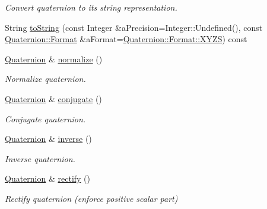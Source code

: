 \begin{DoxyCompactItemize}
\begin{DoxyCompactList}\small\item\em Convert quaternion to its string representation. \end{DoxyCompactList}\item 
String \hyperlink{classlibrary_1_1math_1_1geom_1_1trf_1_1rot_1_1_quaternion_a7e25375352f2e329a6053524d7deb226}{to\+String} (const Integer \&a\+Precision=Integer\+::\+Undefined(), const \hyperlink{classlibrary_1_1math_1_1geom_1_1trf_1_1rot_1_1_quaternion_a2ca851b117657819310fe5a9b9e5d681}{Quaternion\+::\+Format} \&a\+Format=\hyperlink{classlibrary_1_1math_1_1geom_1_1trf_1_1rot_1_1_quaternion_a2ca851b117657819310fe5a9b9e5d681a11c51ecd5dc6f86ba3c1ae79e21482f5}{Quaternion\+::\+Format\+::\+X\+Y\+ZS}) const
\item 
\hyperlink{classlibrary_1_1math_1_1geom_1_1trf_1_1rot_1_1_quaternion}{Quaternion} \& \hyperlink{classlibrary_1_1math_1_1geom_1_1trf_1_1rot_1_1_quaternion_a54cc89da4b3f36d7037b940c141e07ce}{normalize} ()
\begin{DoxyCompactList}\small\item\em Normalize quaternion. \end{DoxyCompactList}\item 
\hyperlink{classlibrary_1_1math_1_1geom_1_1trf_1_1rot_1_1_quaternion}{Quaternion} \& \hyperlink{classlibrary_1_1math_1_1geom_1_1trf_1_1rot_1_1_quaternion_a4c584b96ce248b069a85adb1c5abd74c}{conjugate} ()
\begin{DoxyCompactList}\small\item\em Conjugate quaternion. \end{DoxyCompactList}\item 
\hyperlink{classlibrary_1_1math_1_1geom_1_1trf_1_1rot_1_1_quaternion}{Quaternion} \& \hyperlink{classlibrary_1_1math_1_1geom_1_1trf_1_1rot_1_1_quaternion_a596228c41391cbba85ca425d9c7c3dbd}{inverse} ()
\begin{DoxyCompactList}\small\item\em Inverse quaternion. \end{DoxyCompactList}\item 
\hyperlink{classlibrary_1_1math_1_1geom_1_1trf_1_1rot_1_1_quaternion}{Quaternion} \& \hyperlink{classlibrary_1_1math_1_1geom_1_1trf_1_1rot_1_1_quaternion_a41cbb9a19380bd08110455190a0a9770}{rectify} ()
\begin{DoxyCompactList}\small\item\em Rectify quaternion (enforce positive scalar part) \end{DoxyCompactList}\end{DoxyCompactItemize}
